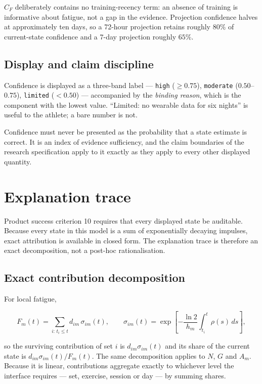 \documentclass[11pt]{article}
\begin{document}
$C_F$ deliberately contains no training-recency term: an absence of training is informative about fatigue, not a gap in the evidence. Projection confidence halves at approximately ten days, so a 72-hour projection retains roughly $80\%$ of current-state confidence and a 7-day projection roughly $65\%$.

\subsection{Display and claim discipline}

Confidence is displayed as a three-band label --- \texttt{high} ($\ge0.75$), \texttt{moderate} ($0.50$--$0.75$), \texttt{limited} ($<0.50$) --- accompanied by the \emph{binding reason}, which is the component with the lowest value. ``Limited: no wearable data for six nights'' is useful to the athlete; a bare number is not.

Confidence must never be presented as the probability that a state estimate is correct. It is an index of evidence sufficiency, and the claim boundaries of the research specification apply to it exactly as they apply to every other displayed quantity.

\section{Explanation trace}
\label{sec:trace}

Product success criterion 10 requires that every displayed state be auditable. Because every state in this model is a sum of exponentially decaying impulses, exact attribution is available in closed form. The explanation trace is therefore an exact decomposition, not a post-hoc rationalisation.

\subsection{Exact contribution decomposition}

For local fatigue,

\begin{equation}
F_m(t)=\sum_{i:\,t_i\le t} d_{im}\,\sigma_{im}(t),
\qquad
\sigma_{im}(t)=\exp\left[-\frac{\ln2}{h_m}\int_{t_i}^{t}\rho(s)\,ds\right],
\end{equation}

so the surviving contribution of set $i$ is $d_{im}\sigma_{im}(t)$ and its share of the current state is $d_{im}\sigma_{im}(t)/F_m(t)$. The same decomposition applies to $N$, $G$ and $A_m$. Because it is linear, contributions aggregate exactly to whichever level the interface requires --- set, exercise, session or day --- by summing shares.
\end{document}
